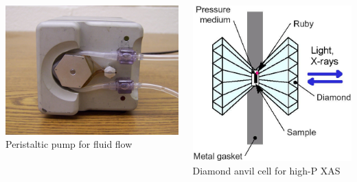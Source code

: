 \documentclass[10pt, xcolor=x11names, compress]{beamer}
\begin{document}
\begin{frame}
\begin{columns}[T]
\begin{column}{0.25\linewidth}
\begin{center}
        \includegraphics[width=0.77\linewidth]{exp/peripump.jpg}\\
        Peristaltic pump for fluid flow
      \end{center}
    \end{column}
    \begin{column}{0.25\linewidth}
      \begin{center}
        \includegraphics[width=0.72\linewidth]{exp/daq.jpg}\\
        Diamond anvil cell for high-P XAS
        \smallskip


\end{center}
\end{column}
\end{columns}
\end{frame}
\end{document}

